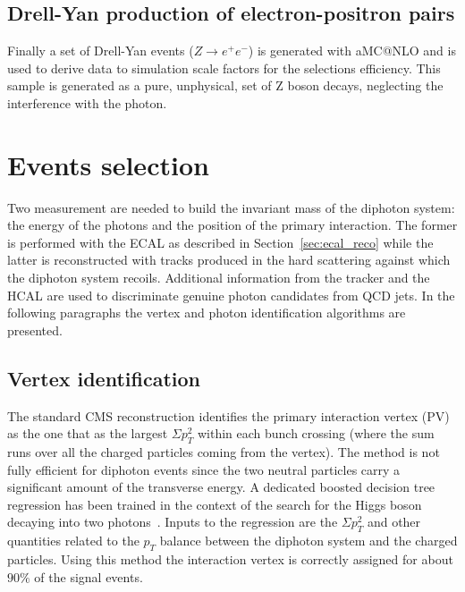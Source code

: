 \subsection{Drell-Yan production of electron-positron pairs}
Finally a set of Drell-Yan events ($Z \to e^{+}e^{-}$) is generated with aMC@NLO and is
used to derive data to simulation scale factors for the selections efficiency. This sample is generated
as a pure, unphysical, set of Z boson decays, neglecting the interference with the photon.

\clearpage
\section{Events selection}
\label{sec:dipho_selection}
Two measurement are needed to build the invariant mass of the diphoton system: the energy of the
photons and the position of the primary interaction. The former is performed with the ECAL as described in
Section~\ref{sec:ecal_reco} while the latter is reconstructed with tracks produced in the hard scattering against which
the diphoton system recoils. Additional information from the tracker and the HCAL are used to discriminate
genuine photon candidates from QCD jets.
In the following paragraphs the vertex and photon identification algorithms are presented.

\subsection{Vertex identification}
The standard CMS reconstruction identifies the primary interaction vertex (PV) as the one 
that as the largest $\Sigma p_T^2$ within each bunch crossing (where the sum runs over all the charged particles
coming from the vertex). The method is not fully efficient for diphoton events since the two neutral
particles carry a significant amount of the transverse energy.
A dedicated boosted decision tree regression has been trained in the context of the search for the
Higgs boson decaying into two photons~\cite{Khachatryan:2014ira}. Inputs to the regression are the $\Sigma p_T^2$ and
other quantities related to the $p_T$ balance between the diphoton system and the charged particles.
Using this method the interaction vertex is correctly assigned for about $90\%$ of the signal events.

